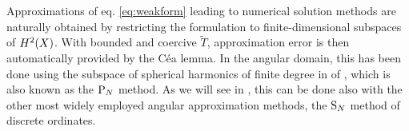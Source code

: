 Approximations of eq. \eqref{eq:weakform} leading to numerical solution methods are naturally obtained by restricting
the formulation to finite-dimensional subspaces of $\Hp[2](X)$. With bounded and coercive $\tilde T$, approximation
error is then automatically provided by the C{\' e}a lemma. In the angular domain, this has
been done using the subspace of spherical harmonics of finite degree in \cite{bourhrara3} of \cite{Manteuffel}, which
is also known as the $\PN$ method. As we will see in , this can be done also with the other most widely 
employed angular approximation methods, the $\SN$ method of discrete ordinates.

